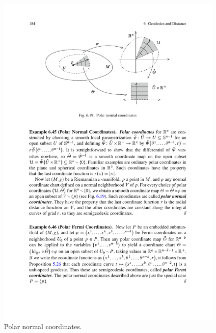\begin{example}
\begin{itemize}
\begin{figure}[htbp]
\centering
\includegraphics{pictures/polar-normal-coordinates}
\caption{Polar normal coordinates.}
\end{figure}


\end{itemize}
\end{example}
